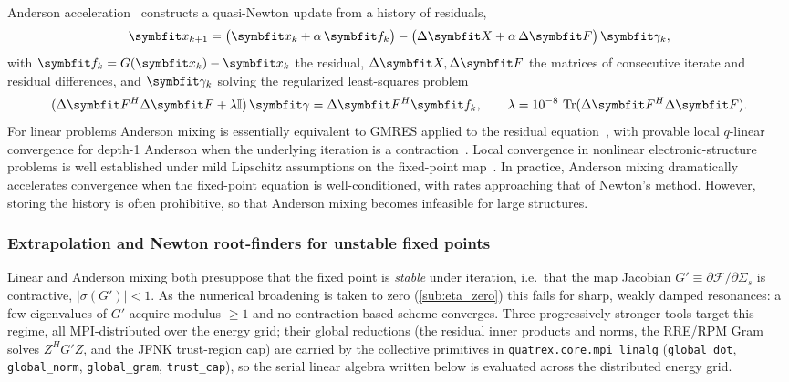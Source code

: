 Anderson acceleration~\cite{anderson_iterative_1965} constructs a quasi-Newton
update from a history of residuals,
\begin{equation}\label{eq:anderson}
  \vc{x}_{k+1}
  = \bigl(\vc{x}_k + \alpha\,\vc{f}_k\bigr)
    - \bigl(\Delta\vc{X} + \alpha\,\Delta\vc{F}\bigr)\,\vc{\gamma}_k,
\end{equation}
with $\vc{f}_k = G(\vc{x}_k) - \vc{x}_k$ the residual,
$\Delta\vc{X}, \Delta\vc{F}$ the matrices of consecutive iterate and
residual differences, and $\vc{\gamma}_k$ solving the regularized
least-squares problem
\begin{equation}
  (\Delta\vc{F}^H \Delta\vc{F} + \lambda \mathbb{I})\,\vc{\gamma}
  = \Delta\vc{F}^H \vc{f}_k,
  \qquad
  \lambda = 10^{-8}\,\tr(\Delta\vc{F}^H \Delta\vc{F}).
\end{equation}
For linear problems Anderson mixing is
essentially equivalent to GMRES applied to the residual
equation~\cite{walker_anderson_2011,rohwedder_analysis_2011}, with provable
local $q$-linear convergence for depth-1
Anderson when the underlying iteration is a
contraction~\cite{toth_convergence_2015,bian_anderson_2021}. Local
convergence in nonlinear electronic-structure problems is well
established under mild Lipschitz assumptions on the
fixed-point map~\cite{rohwedder_analysis_2011,toth_convergence_2015}. In
practice, Anderson mixing dramatically accelerates convergence when the
fixed-point equation is well-conditioned, with rates approaching that
of Newton's method. However, storing the history is often prohibitive, so that
Anderson mixing becomes infeasible for large structures.

\subsubsection{Extrapolation and Newton root-finders for unstable fixed points}
\label{sub:rootfinders}

Linear and Anderson mixing both presuppose that the fixed point is
\emph{stable} under iteration, i.e.\ that the map Jacobian
$G'\equiv\partial\mathcal{F}/\partial\Sigma_s$ is contractive,
$|\sigma(G')|<1$. As the numerical broadening is taken to zero
(\cref{sub:eta_zero}) this fails for sharp, weakly damped resonances: a few
eigenvalues of $G'$ acquire modulus $\geq 1$ and no contraction-based scheme
converges. Three progressively stronger tools target this regime, all
MPI-distributed over the energy grid; their global reductions (the residual
inner products and norms, the RRE/RPM Gram solves $Z^{H}G'Z$, and the JFNK
trust-region cap) are carried by the collective primitives in
\texttt{quatrex.core.mpi\_linalg} (\texttt{global\_dot}, \texttt{global\_norm},
\texttt{global\_gram}, \texttt{trust\_cap}), so the serial linear algebra written
below is evaluated across the distributed energy grid.

